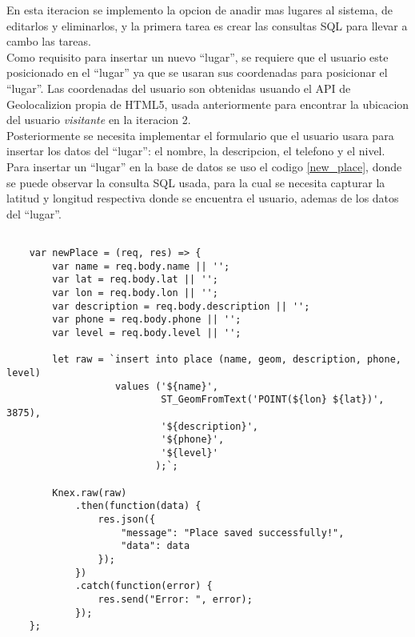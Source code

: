 En esta iteracion se implemento la opcion de anadir mas lugares al sistema, de editarlos y eliminarlos, y la primera tarea es crear las consultas SQL para llevar a cambo las tareas. \\


Como requisito para insertar un nuevo ``lugar'', se requiere que el usuario este posicionado en el ``lugar'' ya que se usaran sus coordenadas para posicionar el ``lugar''. Las coordenadas del usuario son obtenidas usuando el API de Geolocalizion propia de HTML5, usada anteriormente para encontrar la ubicacion del usuario \emph{visitante} en la iteracion 2.\\

Posteriormente se necesita implementar el formulario que el usuario usara para insertar los datos del ``lugar'': el nombre, la descripcion, el telefono y el nivel.\\

Para insertar un ``lugar''  en la base de datos se uso el codigo \ref{new_place}, donde se puede observar la consulta SQL usada, para la cual se necesita capturar la latitud y longitud respectiva donde se encuentra el usuario, ademas de los datos del ``lugar''.\\

\begin{center}
  \begin{lstlisting}[label=new_place,caption=Insertar un ``lugar'' en la base de datos.]

    var newPlace = (req, res) => {
        var name = req.body.name || '';
        var lat = req.body.lat || '';
        var lon = req.body.lon || '';
        var description = req.body.description || '';
        var phone = req.body.phone || '';
        var level = req.body.level || '';

        let raw = `insert into place (name, geom, description, phone, level)
                   values ('${name}',
                           ST_GeomFromText('POINT(${lon} ${lat})', 3875),
                           '${description}',
                           '${phone}',
                           '${level}'
                          );`;

        Knex.raw(raw)
            .then(function(data) {
                res.json({
                    "message": "Place saved successfully!",
                    "data": data
                });
            })
            .catch(function(error) {
                res.send("Error: ", error);
            });
    };

  \end{lstlisting}
\end{center}


